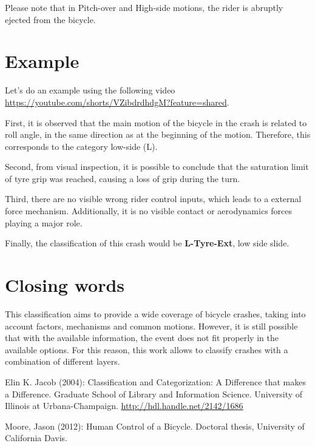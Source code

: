 \documentclass{article}
\begin{document}
Please note that in Pitch-over and High-side motions, the rider is abruptly ejected from the bicycle.




\section{Example}

Let's do an example using the following video \url{https://youtube.com/shorts/VZibdrdhdgM?feature=shared}.

First, it is observed that the main motion of the bicycle in the crash is related to roll angle, in the same direction as at the beginning of the motion.
%
Therefore, this corresponds to the category low-side (L).


Second, from visual inspection, it is possible to conclude that the saturation limit of tyre grip was reached, causing a loss of grip during the turn.


Third, there are no visible wrong rider control inputs, which leads to a external force mechanism.
%
Additionally, it is no visible contact or aerodynamics forces playing a major role.


Finally, the classification of this crash would be \textbf{L-Tyre-Ext}, low side slide.


\section{Closing words}

This classification aims to provide a wide coverage of bicycle crashes, taking into account factors, mechanisms and common motions.
%
However, it is still possible that with the available information, the event does not fit properly in the available options.
%
For this reason, this work allows to classify crashes with a combination of different layers.



\begin{thebibliography}{9}

     Elin K. Jacob (2004):  Classification and Categorization: A Difference that makes a Difference. Graduate School of Library and Information Science. University of Illinois at Urbana-Champaign. \url{http://hdl.handle.net/2142/1686}

     Moore, Jason (2012): Human Control of a Bicycle. Doctoral thesis, University of California Davis.


\end{thebibliography}
\end{document}
